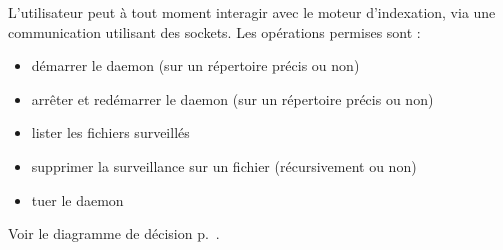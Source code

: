 L'utilisateur peut à tout moment interagir avec le moteur d'indexation, via une communication utilisant des sockets. Les opérations permises sont :
\begin{itemize}
\item démarrer le daemon (sur un répertoire précis ou non)
\item arrêter et redémarrer le daemon (sur un répertoire précis ou non)
\item lister les fichiers surveillés
\item supprimer la surveillance sur un fichier (récursivement ou non)
\item tuer le daemon
\end{itemize}

Voir le diagramme de décision p.~\pageref{decision-mi}.
